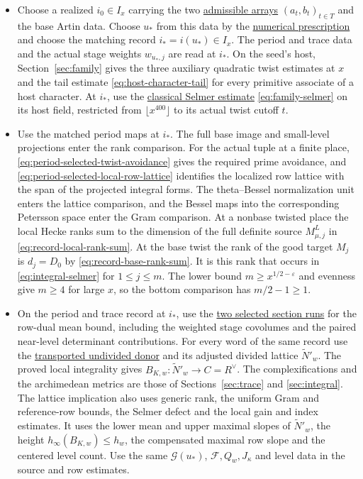 \begin{itemize}
\item Choose a realized \(i_0\in I_x\) carrying the two
\hyperlink{proof.selection-realized-samples}{admissible arrays}
\((a_t,b_t)_{t\in T}\) and the base Artin data.
Choose \(u_*\) from this data by the
\hyperlink{proof.classical-maximizing-translate}{numerical prescription}
and choose the matching record \(i_*=i(u_*)\in I_x\). The period and
trace data and the actual stage weights \(w_{u_*,j}\) are read at \(i_*\).
On the seed's host, Section~\ref{sec:family} gives the three auxiliary
quadratic twist estimates at \(x\) and the tail estimate
\eqref{eq:host-character-tail} for every primitive associate of a host
character. At \(i_*\), use the
\hyperlink{proof.selmer-classical-residual}{classical Selmer estimate}
\eqref{eq:family-selmer} on its host field, restricted from
\(\lfloor x^{400}\rfloor\) to its actual twist cutoff \(t\).

\item Use the matched period maps at \(i_*\). The full base image and
small-level projections enter the rank comparison. For the actual
tuple at a finite place, \eqref{eq:period-selected-twist-avoidance}
gives the required prime avoidance, and
\eqref{eq:period-selected-local-row-lattice} identifies the localized
row lattice with the span of the projected integral forms.
The theta--Bessel normalization unit enters the lattice comparison, and the
Bessel maps into the corresponding Petersson space enter the Gram
comparison. At a nonbase twisted place the local Hecke ranks sum
to the dimension of the full definite source \(M^L_{\mu,j}\) in
\eqref{eq:record-local-rank-sum}. At the base twist the rank of
the good target \(M_j\) is \(d_j=D_0\) by
\eqref{eq:record-base-rank-sum}. It is this rank that occurs in
\eqref{eq:integral-selmer} for \(1\le j\le m\).
The lower bound \(m\ge x^{1/2-\varepsilon}\) and evenness give
\(m\ge4\) for large \(x\), so the bottom comparison has \(m/2-1\ge1\).

\item On the period and trace record at \(i_*\), use the
\hyperlink{proof.section-run-family-identification}{two selected section runs}
for the row-dual mean bound, including the weighted stage covolumes
and the paired near-level determinant contributions. For every word
of the same record use the
\hyperlink{proof.ramified-donor-identification}{transported undivided donor}
and its adjusted divided lattice \(\widetilde N'_w\).
The proved local integrality gives
\(B_{K,w}\colon\widetilde N'_w\to C=R^\vee\).
The complexifications and the archimedean metrics are those of
Sections~\ref{sec:trace} and \ref{sec:integral}.
The lattice implication also uses generic rank, the uniform Gram
and reference-row bounds, the Selmer defect and the local gain and
index estimates. It uses the lower mean and upper maximal slopes of
\(\widetilde N'_w\), the height \(h_\infty(B_{K,w})\le h_w\),
the compensated maximal row slope and the centered level count.
Use the same \(\mathcal G(u_*)\),
\(\mathcal F,Q_w,J_\kappa\) and level data in the source and row
estimates.
\end{itemize}

